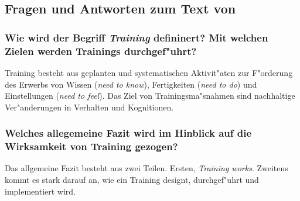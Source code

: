 \subsection{Fragen und Antworten zum Text von \textcite{salas_science_2012}}
\subsubsection{Wie wird der Begriff \emph{Training} defininert? Mit welchen Zielen werden Trainings durchgef"uhrt?}

Training besteht aus geplanten und systematischen Aktivit"aten zur F"orderung des Erwerbs von Wissen (\emph{need to know}), Fertigkeiten (\emph{need to do}) und Einstellungen (\emph{need to feel}). Das Ziel von Trainingsma"snahmen sind nachhaltige Ver"anderungen in Verhalten und Kognitionen.

\subsubsection{Welches allegemeine Fazit wird im Hinblick auf die Wirksamkeit von Training gezogen?}
Das allgemeine Fazit besteht aus zwei Teilen. Ersten, \emph{Training works}. Zweitens kommt es stark darauf an, wie ein Training designt, durchgef"uhrt und implementiert wird.

